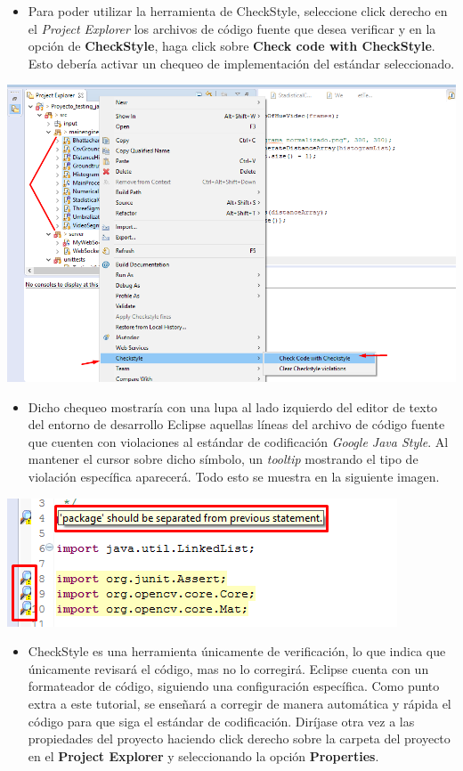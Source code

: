 \documentclass[a4paper]{article}
\begin{document}
{\justify
\begin{itemize}
\item Para poder utilizar la herramienta de CheckStyle, seleccione click derecho en el \textit{Project Explorer} los archivos de código fuente que desea verificar y en la opción de \textbf{CheckStyle}, haga click sobre \textbf{Check code with CheckStyle}. Esto debería activar un chequeo de implementación del estándar seleccionado.
\end{itemize} 
\centering
\includegraphics[scale=0.5]{Screenshot_CheckStyle_5.png}
\justify
\begin{itemize}
\item Dicho chequeo mostraría con una lupa al lado izquierdo del editor de texto del entorno de desarrollo Eclipse aquellas líneas del archivo de código fuente que cuenten con violaciones al estándar de codificación \textit{Google Java Style}. Al mantener el cursor sobre dicho símbolo, un \textit{tooltip} mostrando el tipo de violación específica aparecerá. Todo esto se muestra en la siguiente imagen.
\end{itemize} 
\centering
\includegraphics[scale=0.8]{Screenshot_CheckStyle_6.png}
\justify
\begin{itemize}
\item CheckStyle es una herramienta únicamente de verificación, lo que indica que únicamente revisará el código, mas no lo corregirá. Eclipse cuenta con un formateador de código, siguiendo una configuración específica. Como punto extra a este tutorial, se enseñará a corregir de manera automática y rápida el código para que siga el estándar de codificación. Diríjase otra vez a las propiedades del proyecto haciendo click derecho sobre la carpeta del proyecto en el \textbf{Project Explorer} y seleccionando la opción  \textbf{Properties}. 

\end{itemize}}
\end{document}
